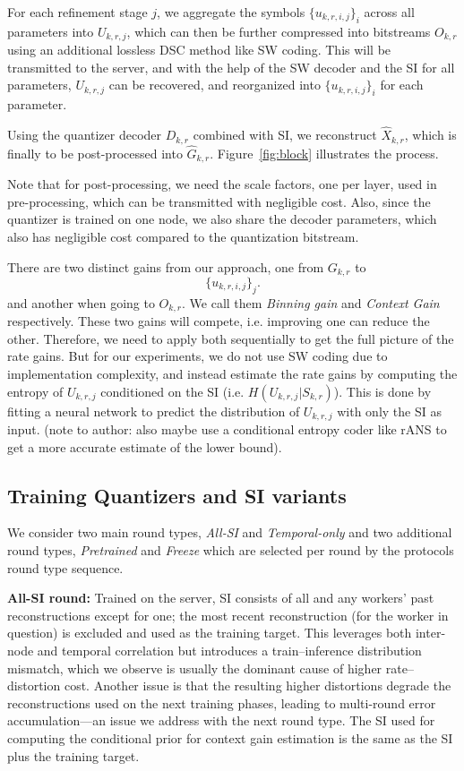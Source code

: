 For each refinement stage \(j\), we aggregate the symbols \(\{u_{k,r,i,j}\}_{i}\) across all parameters into \(U_{k,r,j}\), which can then be further compressed into bitstreams \(O_{k,r}\) using an additional lossless DSC method like SW coding. This will be transmitted to the server, and with the help of the SW decoder and the SI for all parameters, \(U_{k,r,j}\) can be recovered, and reorganized into \(\{u_{k,r,i,j}\}_{i}\) for each parameter.

Using the quantizer decoder \(D_{k,r}\) combined with SI, we reconstruct \(\hat X_{k,r}\), which is finally to be post-processed into \(\hat G_{k,r}\). Figure~\ref{fig:block} illustrates the process.

Note that for post-processing, we need the scale factors, one per layer, used in pre-processing, which can be transmitted with negligible cost. Also, since the quantizer is trained on one node, we also share the decoder parameters, which also has negligible cost compared to the quantization bitstream.


There are two distinct gains from our approach, one from \(G_{k,r}\) to \[\{u_{k,r,i,j}\}_{j}.\] and another when going to \(O_{k,r}\). We call them \emph{Binning gain} and \emph{Context Gain} respectively. These two gains will compete, i.e. improving one can reduce the other. Therefore, we need to apply both sequentially to get the full picture of the rate gains. But for our experiments, we do not use SW coding due to implementation complexity, and instead estimate the rate gains by computing the entropy of \(U_{k,r,j}\) conditioned on the SI (i.e. \(H(U_{k,r,j}|S_{k,r})\)). This is done by fitting a neural network to predict the distribution of \(U_{k,r,j}\) with only the SI as input. (note to author: also maybe use a conditional entropy coder like rANS to get a more accurate estimate of the lower bound).

\subsection{Training Quantizers and SI variants}
We consider two main round types, \emph{All-SI} and \emph{Temporal-only} and two additional round types, \emph{Pretrained} and \emph{Freeze} which are selected per round by the protocols round type sequence.

\textbf{All-SI round:}
Trained on the server, SI consists of all and any workers' past reconstructions except for one; the most recent reconstruction (for the worker in question) is excluded and used as the training target. This leverages both inter-node and temporal correlation but introduces a train--inference distribution mismatch, which we observe is usually the dominant cause of higher rate--distortion cost. Another issue is that the resulting higher distortions degrade the reconstructions used on the next training phases, leading to multi-round error accumulation---an issue we address with the next round type.
The SI used for computing the conditional prior for context gain estimation is the same as the SI plus the training target.

